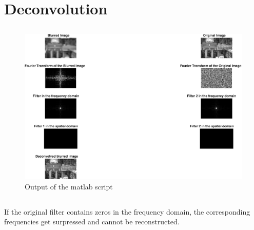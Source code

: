 \documentclass[DIN, pagenumber=false, fontsize=11pt, parskip=half]{scrartcl}
\begin{document}
    \section{Deconvolution}
    \subsection{}
    
    \subsection{}
    \begin{figure}[H]
        \centering
        \includegraphics[width=\textwidth]{sh03ex02.eps}
        \caption{Output of the matlab script}
    \end{figure}
    \subsection{}
    If the original filter contains zeros in the frequency domain, the corresponding frequencies get surpressed and cannot be reconstructed.
\end{document}
